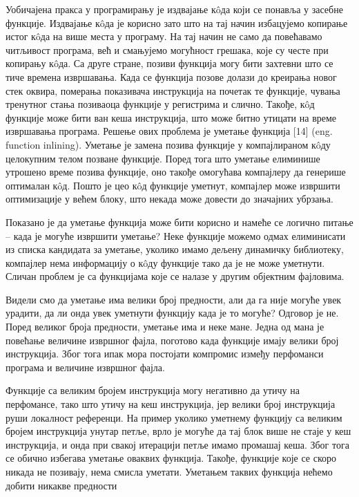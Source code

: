 \documentclass[12pt,oneside]{memoir}
\begin{document}
Уобичајена пракса у програмирању је издвајање к\^{o}да који се понавља у 
засебне функције.
Издвајање к\^{o}да је корисно зато што на тај начин избацујемо копирање
истог к\^{o}да на више места у програму.
На тај начин не само да повећавамо читљивост програма, већ и смањујемо
могућност грешака, које су честе при копирању  к\^{o}да.
Са друге стране, позиви функција могу бити захтевни што се тиче времена извршавања.
Када се функција позове долази до креирања новог стек оквира, померања показивача
инструкција на почетак те функције, чувања тренутног стања позиваоца функције у 
регистрима и слично.
Такође,  к\^{o}д функције може бити ван кеша инструкција, што може битно
утицати на време извршавања програма.
Решење ових проблема је уметање функција [14] (eng. function inlining).
Уметање је замена позива функције у компајлираном к\^{o}ду
целокупним телом позване функције.
Поред тога што уметање елиминише утрошено време позива функције, оно такође
омогућава компајлеру да генерише оптималан к\^{o}д.
Пошто је цео к\^{o}д функције уметнут, компајлер може извршити оптимизације у већем
блоку, што некада може довести до значајних убрзања.
\par
Показано је да уметање функција може бити корисно и намеће се логично питање --
када је могуће извршити уметање?
Неке функције можемо одмах елиминисати из списка кандидата за уметање, уколико имамо дељену динамичку библиотеку, компајлер нема
информацију о к\^{o}ду функције тако да је не може уметнути.
Сличан проблем је са функцијама које се налазе у другим објектним фајловима.
\par 
Видели смо да уметање има велики број предности, али да га није могуће увек
урадити, да ли онда увек уметнути функцију када је то могуће?
Одговор је не. 
Поред великог броја предности, уметање има и неке мане.
Једна од мана је повећање величине извршног фајла, поготово када функције имају
велики број инструкција.
Због тога ипак мора постојати компромис између перфоманси програма и величине
извршног фајла.
\par
Функције са великим бројем инструкција могу негативно да утичу на перфомансе, тако
што утичу на кеш инструкција, јер велики број инструкција руши локалност референци. 
На пример уколико уметнему функцију са великим бројем инструкција 
унутар петље, врло је могуће да тај блок више не стаје у кеш инструкција,
и онда при свакој итерацији петље имамо промашај кеша. Због тога се
обично избегава уметање оваквих функција.
Такође, функције које се скоро никада не  позивају, нема смисла уметати.
Уметањем таквих функција нећемо добити никакве предности
\end{document}
